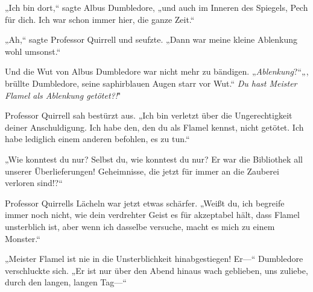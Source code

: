 „Ich bin dort,“ sagte Albus Dumbledore, „und auch im Inneren des Spiegels, Pech für dich. Ich war schon immer hier, die ganze Zeit.“

„Ah,“ sagte Professor Quirrell und seufzte. „Dann war meine kleine Ablenkung wohl umsonst.“

Und die Wut von Albus Dumbledore war nicht mehr zu bändigen.
„\emph{Ablenkung}?“„, brüllte Dumbledore, seine saphirblauen Augen starr vor Wut.“ \emph{Du hast Meister Flamel als Ablenkung getötet?!}"

Professor Quirrell sah bestürzt aus. „Ich bin verletzt über die Ungerechtigkeit deiner Anschuldigung. Ich habe den, den du als Flamel kennst, nicht getötet. Ich habe lediglich einem anderen befohlen, es zu tun.“

„Wie konntest du nur? Selbst du, wie konntest du nur? Er war die Bibliothek all unserer Überlieferungen! Geheimnisse, die jetzt für immer an die Zauberei verloren sind!?“

Professor Quirrells Lächeln war jetzt etwas schärfer. „Weißt du, ich begreife immer noch nicht, wie dein verdrehter Geist es für akzeptabel hält, dass Flamel unsterblich ist, aber wenn ich dasselbe versuche, macht es mich zu einem Monster.“

„Meister Flamel ist nie in die Unsterblichkeit hinabgestiegen! Er—“ Dumbledore verschluckte sich. „Er ist nur über den Abend hinaus wach geblieben, uns zuliebe, durch den langen, langen Tag—“

